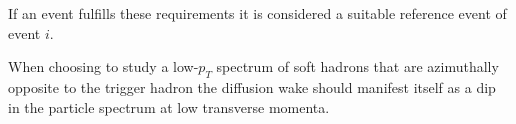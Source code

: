 \documentclass[
  a4paper,
  12pt,
  oneside,
  parskip=half,
  listof=totoc,
  bibliography=totoc,
  DIV=12,
  numbers=noenddot,
  BA.tex
  ]{subfiles}
\begin{document}
If an event fulfills these requirements it is considered a suitable reference event of event $i$.

When choosing to study a low-$p_T$ spectrum of soft hadrons that are azimuthally opposite to the trigger hadron the diffusion wake should manifest itself as a dip in the particle spectrum at low transverse momenta. 

\fi
\end{document}
